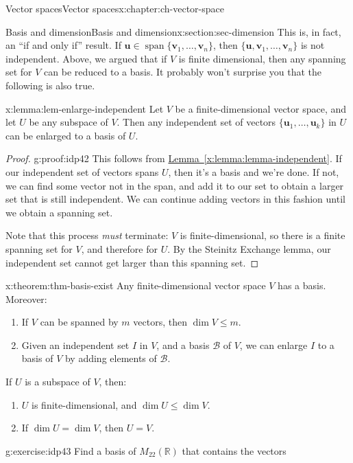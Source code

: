 \documentclass[oneside,10pt,]{book}
\newcommand{\xreffont}{\relax}
\numberwithin{equation}{section}
\newcommand{\spn}{\operatorname{span}}
\newcommand{\R}{\mathbb{R}}
\newcommand{\uu}{\mathbf{u}}
\newcommand{\vv}{\mathbf{v}}
\begin{document}
\begin{chapterptx}{Vector spaces}{}{Vector spaces}{}{}{x:chapter:ch-vector-space}
\begin{sectionptx}{Basis and dimension}{}{Basis and dimension}{}{}{x:section:sec-dimension}
This is, in fact, an ``if and only if'' result. If \(\uu\in\spn\{\vv_1,\ldots, \vv_n\}\), then \(\{\uu,\vv_1,\ldots, \vv_n\}\) is not independent. Above, we argued that if \(V\) is finite dimensional, then any spanning set for \(V\) can be reduced to a basis. It probably won't surprise you that the following is also true.%
\begin{lemma}{}{}{x:lemma:lem-enlarge-independent}%
Let \(V\) be a finite-dimensional vector space, and let \(U\) be any subspace of \(V\). Then any independent set of vectors \(\{\uu_1,\ldots, \uu_k\}\) in \(U\) can be enlarged to a basis of \(U\).%
\end{lemma}
\begin{proof}{}{g:proof:idp42}
This follows from \hyperref[x:lemma:lemma-independent]{Lemma~{\xreffont\ref{x:lemma:lemma-independent}}}. If our independent set of vectors spans \(U\), then it's a basis and we're done. If not, we can find some vector not in the span, and add it to our set to obtain a larger set that is still independent. We can continue adding vectors in this fashion until we obtain a spanning set.%
\par
Note that this process \emph{must} terminate: \(V\) is finite-dimensional, so there is a finite spanning set for \(V\), and therefore for \(U\). By the Steinitz Exchange lemma, our independent set cannot get larger than this spanning set.%
\end{proof}
\begin{theorem}{}{}{x:theorem:thm-basis-exist}%
Any finite-dimensional vector space \(V\) has a basis. Moreover:%
\begin{enumerate}
\item{}If \(V\) can be spanned by \(m\) vectors, then \(\dim V\leq m\).%
\item{}Given an independent set \(I\) in \(V\), and a basis \(\mathcal{B}\) of \(V\), we can enlarge \(I\) to a basis of \(V\) by adding elements of \(\mathcal{B}\).%
\end{enumerate}
%
\par
If \(U\) is a subspace of \(V\), then:%
\begin{enumerate}
\item{}\(U\) is finite-dimensional, and \(\dim U\leq \dim V\).%
\item{}If \(\dim U = \dim V\), then \(U=V\).%
\end{enumerate}
%
\end{theorem}
\begin{inlineexercise}{}{g:exercise:idp43}%
Find a basis of \(M_{22}(\R)\) that contains the vectors%

\end{inlineexercise}
\end{sectionptx}
\end{chapterptx}
\end{document}
